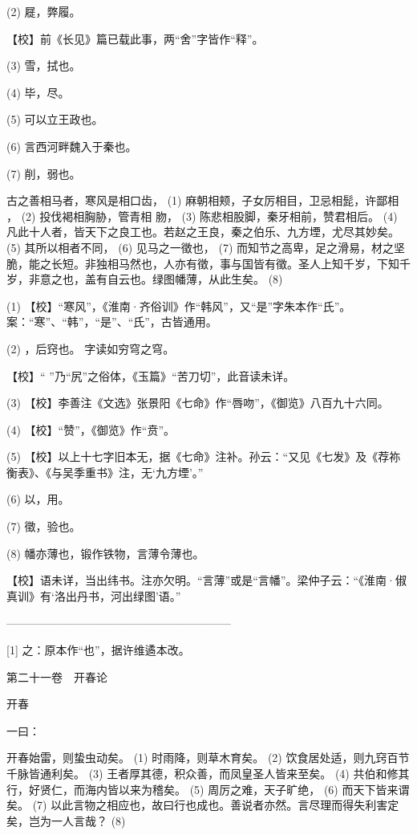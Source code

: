 \documentclass[12pt,UTF8]{ctexbook}
\begin{document}
(2) 屣，弊履。

【校】前《长见》篇已载此事，两“舍”字皆作“释”。

(3) 雪，拭也。

(4) 毕，尽。

(5) 可以立王政也。

(6) 言西河畔魏入于秦也。

(7) 削，弱也。

古之善相马者，寒风是相口齿， (1) 麻朝相颊，子女厉相目，卫忌相髭，许鄙相 ， (2) 投伐褐相胸胁，管青相 肳， (3) 陈悲相股脚，秦牙相前，赞君相后。 (4) 凡此十人者，皆天下之良工也。若赵之王良，秦之伯乐、九方堙，尤尽其妙矣。 (5) 其所以相者不同， (6) 见马之一徵也， (7) 而知节之高卑，足之滑易，材之坚脆，能之长短。非独相马然也，人亦有徵，事与国皆有徵。圣人上知千岁，下知千岁，非意之也，盖有自云也。绿图幡薄，从此生矣。 (8)

(1) 【校】“寒风”，《淮南·齐俗训》作“韩风”，又“是”字朱本作“氏”。案：“寒”、“韩”，“是”、“氏”，古皆通用。

(2) ，后窍也。 字读如穷穹之穹。

【校】“ ”乃“尻”之俗体，《玉篇》“苦刀切”，此音读未详。

(3) 【校】李善注《文选》张景阳《七命》作“唇吻”，《御览》八百九十六同。

(4) 【校】“赞”，《御览》作“贲”。

(5) 【校】以上十七字旧本无，据《七命》注补。孙云：“又见《七发》及《荐祢衡表》、《与吴季重书》注，无‘九方堙’。”

(6) 以，用。

(7) 徵，验也。

(8) 幡亦薄也，锻作铁物，言薄令薄也。

【校】语未详，当出纬书。注亦欠明。“言薄”或是“言幡”。梁仲子云：“《淮南·俶真训》有‘洛出丹书，河出绿图’语。”




————————————————————

[1] 之：原本作“也”，据许维遹本改。





第二十一卷　开春论



开春


一曰：

开春始雷，则蛰虫动矣。 (1) 时雨降，则草木育矣。 (2) 饮食居处适，则九窍百节千脉皆通利矣。 (3) 王者厚其德，积众善，而凤皇圣人皆来至矣。 (4) 共伯和修其行，好贤仁，而海内皆以来为稽矣。 (5) 周厉之难，天子旷绝， (6) 而天下皆来谓矣。 (7) 以此言物之相应也，故曰行也成也。善说者亦然。言尽理而得失利害定矣，岂为一人言哉？ (8)
\end{document}
